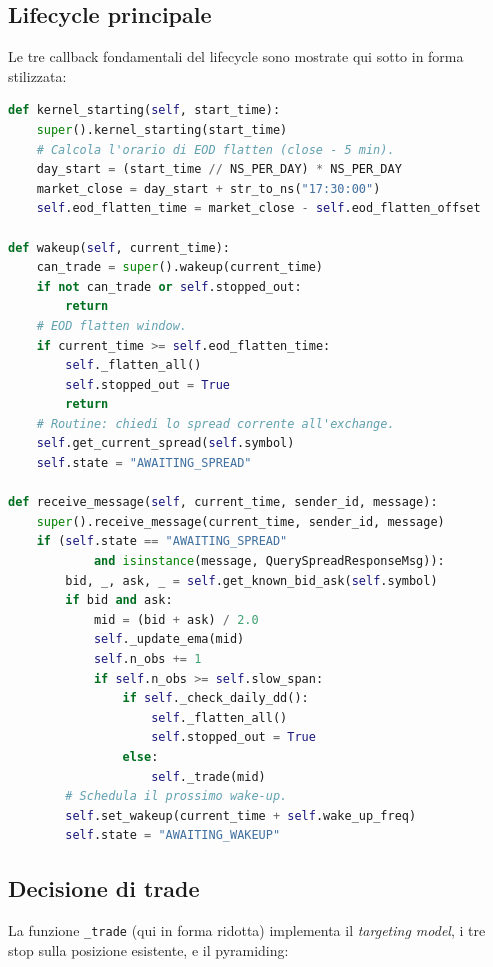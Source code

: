 \documentclass[11pt,a4paper]{article}
\begin{document}
\subsection{Lifecycle principale}

Le tre callback fondamentali del lifecycle sono mostrate qui sotto
in forma stilizzata:

\begin{lstlisting}[language=Python]
def kernel_starting(self, start_time):
    super().kernel_starting(start_time)
    # Calcola l'orario di EOD flatten (close - 5 min).
    day_start = (start_time // NS_PER_DAY) * NS_PER_DAY
    market_close = day_start + str_to_ns("17:30:00")
    self.eod_flatten_time = market_close - self.eod_flatten_offset

def wakeup(self, current_time):
    can_trade = super().wakeup(current_time)
    if not can_trade or self.stopped_out:
        return
    # EOD flatten window.
    if current_time >= self.eod_flatten_time:
        self._flatten_all()
        self.stopped_out = True
        return
    # Routine: chiedi lo spread corrente all'exchange.
    self.get_current_spread(self.symbol)
    self.state = "AWAITING_SPREAD"

def receive_message(self, current_time, sender_id, message):
    super().receive_message(current_time, sender_id, message)
    if (self.state == "AWAITING_SPREAD"
            and isinstance(message, QuerySpreadResponseMsg)):
        bid, _, ask, _ = self.get_known_bid_ask(self.symbol)
        if bid and ask:
            mid = (bid + ask) / 2.0
            self._update_ema(mid)
            self.n_obs += 1
            if self.n_obs >= self.slow_span:
                if self._check_daily_dd():
                    self._flatten_all()
                    self.stopped_out = True
                else:
                    self._trade(mid)
        # Schedula il prossimo wake-up.
        self.set_wakeup(current_time + self.wake_up_freq)
        self.state = "AWAITING_WAKEUP"
\end{lstlisting}

\subsection{Decisione di trade}

La funzione \texttt{\_trade} (qui in forma ridotta) implementa il
\emph{targeting model}, i tre stop sulla posizione esistente, e il
pyramiding:
\end{document}
